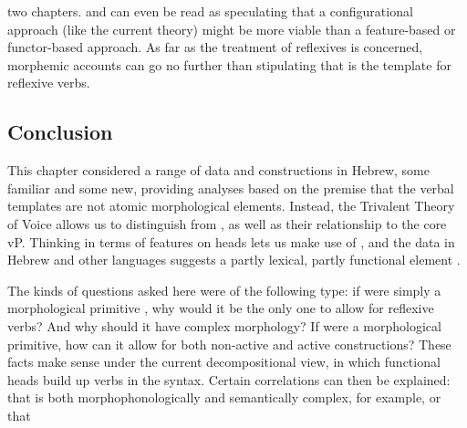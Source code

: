 \begin{exe}
\begin{xlist}
\begin{xlist}
\begin{exe}
\begin{xlist}
\begin{xlist}
\begin{exe}
\begin{xlist}
\begin{xlist}
\begin{exe}
\begin{exe}
\begin{xlist}
\begin{exe}
\begin{exe}
\begin{xlist}
\begin{exe}
\begin{exe}
\begin{exe}
\begin{exe}
\begin{exe}
\begin{xlist}
\begin{exe}
\begin{xlist}
\begin{exe}
\begin{exe}
\begin{xlist}
\begin{exe}
\begin{xlist}
\begin{exe}
\begin{exe}
\begin{exe}
\begin{xlist}
\begin{exe}
\begin{exe}
\begin{exe}
\begin{xlist}
\begin{exe}
\begin{xlist}
\begin{exe}
\begin{xlist}
\begin{exe}
\begin{xlist}
\begin{exe}
\begin{exe}
\begin{exe}
\begin{exe}
\begin{xlist}
\begin{exe}
\begin{xlist}
\begin{exe}
\begin{xlist}
\begin{exe}
\begin{xlist}
\begin{exe}
\begin{xlist}
\begin{exe}
\begin{xlist}
\begin{exe}
\begin{exe}
\begin{exe}
\begin{exe}
\begin{xlist}
\begin{exe}
\begin{xlist}
\begin{exe}
\begin{xlist}
\begin{exe}
\begin{exe}
\begin{xlist}
\begin{exe}
\begin{exe}
\begin{exe}
\begin{exe}
\begin{xlist}
\begin{xlist}
\begin{exe}
\begin{xlist}
\begin{exe}
\begin{exe}
\begin{exe}
\begin{xlist}
\begin{exe}
\begin{exe}
\begin{xlist}
\begin{exe}
\begin{exe}
\begin{exe}
\begin{xlist}
\begin{xlist}
\begin{exe}
\begin{xlist}
\begin{exe}
\begin{exe}
\begin{exe}
\begin{exe}
\begin{xlist}
\begin{exe}
\begin{xlist}
\begin{exe}
\begin{xlist}
\begin{exe}
\begin{exe}
\begin{exe}
\begin{exe}
\begin{exe}
\begin{exe}
\begin{xlist}
\begin{exe}
\begin{xlist}
\begin{exe}
\begin{xlist}
\begin{exe}
\begin{xlist}
\begin{exe}
\begin{xlist}
\begin{exe}
\begin{xlist}
\begin{exe}
\begin{xlist}
two chapters. \citet[197]{arad05} and \citet[564]{borer13oup} can even be read as speculating that a configurational approach (like the current theory) might be more viable than a feature-based or functor-based approach. As far as the treatment of reflexives is concerned, morphemic accounts can go no further than stipulating that {\thit} is the template for reflexive verbs.

	\subsection{Conclusion} \label{vz:others:conc}
This chapter considered a range of data and constructions in Hebrew, some familiar and some new, providing analyses based on the premise that the verbal templates are not atomic morphological elements. Instead, the Trivalent Theory of Voice allows us to distinguish  from {\vz}, as well as their relationship to the core vP. Thinking in terms of features on heads lets us make use of {\pz}, and the data in Hebrew and other languages suggests a partly lexical, partly functional element {\va}.

The kinds of questions asked here were of the following type: if {\thit} were simply a morphological primitive \citep{reinhartsiloni05}, why would it be the only one to allow for reflexive verbs? And why should it have complex morphology? If {\tnif} were a morphological primitive, how can it allow for both non-active and active constructions? These facts make sense under the current decompositional view, in which functional heads build up verbs in the syntax. Certain correlations can then be explained: that {\thit} is both morphophonologically and semantically complex, for example, or that 
\end{xlist}
\end{exe}
\end{xlist}
\end{exe}
\end{xlist}
\end{exe}
\end{xlist}
\end{exe}
\end{xlist}
\end{exe}
\end{xlist}
\end{exe}
\end{xlist}
\end{exe}
\end{exe}
\end{exe}
\end{exe}
\end{exe}
\end{exe}
\end{xlist}
\end{exe}
\end{xlist}
\end{exe}
\end{xlist}
\end{exe}
\end{exe}
\end{exe}
\end{exe}
\end{xlist}
\end{exe}
\end{xlist}
\end{xlist}
\end{exe}
\end{exe}
\end{exe}
\end{xlist}
\end{exe}
\end{exe}
\end{xlist}
\end{exe}
\end{exe}
\end{exe}
\end{xlist}
\end{exe}
\end{xlist}
\end{xlist}
\end{exe}
\end{exe}
\end{exe}
\end{exe}
\end{xlist}
\end{exe}
\end{exe}
\end{xlist}
\end{exe}
\end{xlist}
\end{exe}
\end{xlist}
\end{exe}
\end{exe}
\end{exe}
\end{exe}
\end{xlist}
\end{exe}
\end{xlist}
\end{exe}
\end{xlist}
\end{exe}
\end{xlist}
\end{exe}
\end{xlist}
\end{exe}
\end{xlist}
\end{exe}
\end{exe}
\end{exe}
\end{exe}
\end{xlist}
\end{exe}
\end{xlist}
\end{exe}
\end{xlist}
\end{exe}
\end{xlist}
\end{exe}
\end{exe}
\end{exe}
\end{xlist}
\end{exe}
\end{exe}
\end{exe}
\end{xlist}
\end{exe}
\end{xlist}
\end{exe}
\end{exe}
\end{xlist}
\end{exe}
\end{xlist}
\end{exe}
\end{exe}
\end{exe}
\end{exe}
\end{exe}
\end{xlist}
\end{exe}
\end{exe}
\end{xlist}
\end{exe}
\end{exe}
\end{xlist}
\end{xlist}
\end{exe}
\end{xlist}
\end{xlist}
\end{exe}
\end{xlist}
\end{xlist}
\end{exe}
